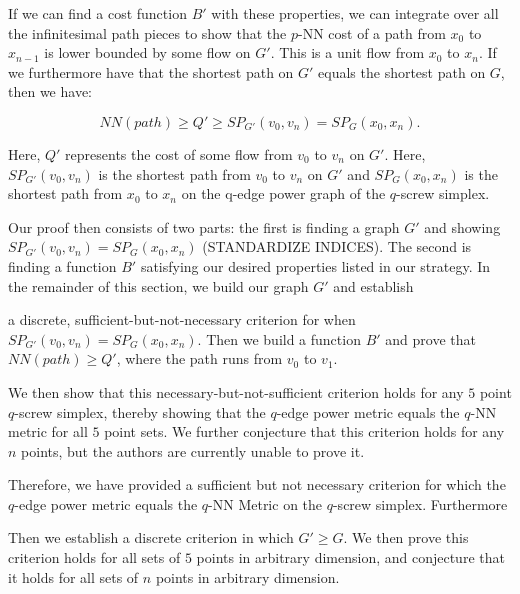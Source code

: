 If we can find a cost function $B'$ with these properties, we can integrate
over all the infinitesimal path pieces to show that the $p$-NN cost of a path
from $x_0$ to $x_{n-1}$ is lower bounded by some flow on $G'$. This is a unit
flow from $x_0$ to $x_n$. If we furthermore have that the shortest path on $G'$
equals the shortest path on $G$, then we have:

$$NN(path) \geq Q' \geq SP_{G'}(v_0, v_n) = SP_{G}(x_0, x_n).$$

Here, $Q'$ represents the cost of some flow from $v_0$ to $v_n$ on $G'$. Here,
$SP_{G'}(v_0, v_n)$ is the shortest path from $v_0$ to $v_n$ on $G'$ and
$SP_G(x_0, x_n)$ is the shortest path from $x_0$ to $x_n$ on the q-edge power
graph of the $q$-screw simplex.

Our proof then consists of two parts: the first is finding a graph $G'$ and
showing $SP_{G'}(v_0, v_n) = SP_G(x_0, x_n)$ (STANDARDIZE INDICES). The second
is finding a function $B'$ satisfying our desired properties listed in our
strategy. In the remainder of this section, we build our graph $G'$ and
establish

a discrete, sufficient-but-not-necessary criterion for when $SP_{G'}(v_0, v_n)
= SP_G(x_0, x_n)$. Then we build a function $B'$ and prove that $NN(path) \geq
Q'$, where the path runs from $v_0$ to $v_1$.

We then show that this necessary-but-not-sufficient criterion holds for any $5$
point $q$-screw simplex, thereby showing that the $q$-edge power metric equals
the $q$-NN metric for all $5$ point sets. We further conjecture that this
criterion holds for any $n$ points, but the authors are currently unable to
prove it.

Therefore, we have provided a sufficient but not necessary criterion for which
the $q$-edge power metric equals the $q$-NN Metric on the $q$-screw simplex.
Furthermore

Then we establish a discrete criterion in which $G' \geq G$. We then prove this
criterion holds for all sets of $5$ points in arbitrary dimension, and
conjecture that it holds for all sets of $n$ points in arbitrary dimension.
